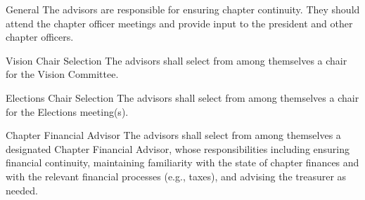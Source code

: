 \begin{enumsubsection}
\item{General} The advisors are responsible for ensuring chapter continuity. They should attend the chapter officer meetings and provide input to the president and other chapter officers.

\item{Vision Chair Selection} The advisors shall select from among themselves a chair for the Vision Committee.\label{sec:visionChair}

\item{Elections Chair Selection} The advisors shall select from among themselves a chair for the Elections meeting(s).

\item{Chapter Financial Advisor} The advisors shall select from among themselves a designated Chapter Financial Advisor, whose responsibilities including ensuring financial continuity, maintaining familiarity with the state of chapter finances and with the relevant financial processes (e.g., taxes), and advising the treasurer as needed.

\end{enumsubsection}